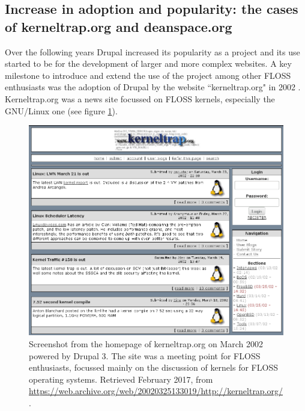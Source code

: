 \subsection{Increase in adoption and popularity: the cases of kerneltrap.org and deanspace.org}

Over the following years Drupal increased its popularity as a project and its use started to be for the development of larger and more complex websites. A key milestone to introduce and extend the use of the project among other FLOSS enthusiasts was the adoption of Drupal by the website ``kerneltrap.org" in 2002 \parencite{benjamin2011definitive}. Kerneltrap.org was a news site focussed on FLOSS kernels, especially the GNU\slash Linux one (see figure \ref{kerneltrap_org}).

\begin{figure}[H]
	\centering
	\includegraphics[scale=0.4]{img/kerneltrap_org.png}
	\caption[Kerneltrap.org on  March 2002]%
    {Screenshot from the homepage of kerneltrap.org on  March 2002 powered by Drupal 3. The site was a meeting point for FLOSS enthusiasts, focussed mainly on the discussion of kernels for FLOSS operating systems. Retrieved  February 2017, from \url{https://web.archive.org/web/20020325133019/http://kerneltrap.org/}.}
	\label{kerneltrap_org}
\end{figure}


